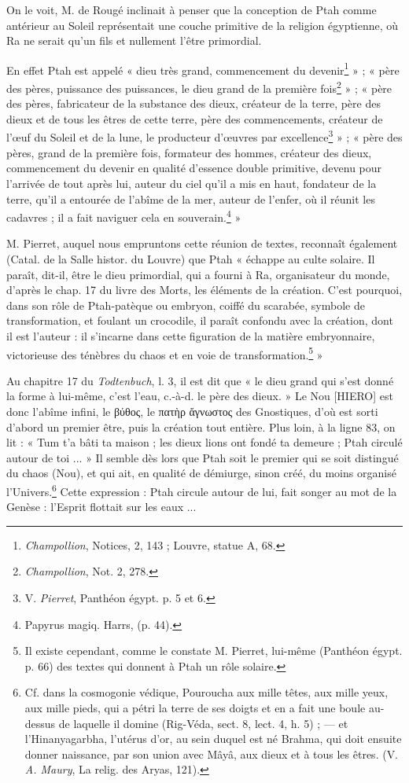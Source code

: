 \documentclass[a4paper, 11pt, oneside]{article}
\begin{document}
On le voit, M. de Rougé inclinait à penser que la conception de Ptah comme antérieur au Soleil représentait une couche primitive de la religion égyptienne, où Ra ne serait qu'un fils et nullement l'être primordial.

En effet Ptah est appelé « dieu très grand, commencement du devenir\footnote{\emph{Champollion}, Notices, 2, 143 ; Louvre, statue A, 68.} » ; « père des pères, puissance des puissances, le dieu grand de la première fois\footnote{\emph{Champollion}, Not. 2, 278.} » ; « père des pères, fabricateur de la substance des dieux, créateur de la terre, père des dieux et de tous les êtres de cette terre, père des commencements, créateur de l'œuf du Soleil et de la lune, le producteur d'œuvres par excellence\footnote{V. \emph{Pierret}, Panthéon égypt. p. 5 et 6.} » ; « père des pères, grand de la première fois, formateur des hommes, créateur des dieux, commencement du devenir en qualité d'essence double primitive, devenu pour l'arrivée de tout après lui, auteur du ciel qu'il a mis en haut, fondateur de la terre, qu'il a entourée de l'abîme de la mer, auteur de l'enfer, où il réunit les cadavres ; il a fait naviguer cela en souverain.\footnote{Papyrus magiq. Harrs, (p. 44).} »

M. Pierret, auquel nous empruntons cette réunion de textes, reconnaît également (Catal. de la Salle histor. du Louvre) que Ptah « échappe au culte solaire. Il paraît, dit-il, être le dieu primordial, qui a fourni à Ra, organisateur du monde, d'après le chap. 17 du livre des Morts, les éléments de la création. C'est pourquoi, dans son rôle de Ptah-patèque ou embryon, coiffé du scarabée, symbole de transformation, et foulant un crocodile, il paraît confondu avec la création, dont il est l'auteur : il s'incarne dans cette figuration de la matière embryonnaire, victorieuse des ténèbres du chaos et en voie de transformation.\footnote{Il existe cependant, comme le constate M. Pierret, lui-même (Panthéon égypt. p. 66) des textes qui donnent à Ptah un rôle solaire.} »

Au chapitre 17 du \emph{Todtenbuch}, l. 3, il est dit que « le dieu grand qui s'est donné la forme à lui-même, c'est l'eau, c.-à-d. le père des dieux. » Le Nou [HIERO] est donc l'abîme infini, le βύθος, le πατὴρ ἄγνωστος des Gnostiques, d'où est sorti d'abord un premier être, puis la création tout entière. Plus loin, à la ligne 83, on lit : « Tum t'a bâti ta maison ; les dieux lions ont fondé ta demeure ; Ptah circulé autour de toi ... » Il semble dès lors que Ptah soit le premier qui se soit distingué du chaos (Nou), et qui ait, en qualité de démiurge, sinon créé, du moins organisé l'Univers.\footnote{Cf. dans la cosmogonie védique, Pouroucha aux mille têtes, aux mille yeux, aux mille pieds, qui a pétri la terre de ses doigts et en a fait une boule au-dessus de laquelle il domine (Rig-Véda, sect. 8, lect. 4, h. 5) ; --- et l'Hinanyagarbha, l'utérus d'or, au sein duquel est né Brahma, qui doit ensuite donner naissance, par son union avec Mâyâ, aux dieux et à tous les êtres. (V. \emph{A. Maury}, La relig. des Aryas, 121).} Cette expression : Ptah circule autour de lui, fait songer au mot de la Genèse : l'Esprit flottait sur les eaux ...
\end{document}
